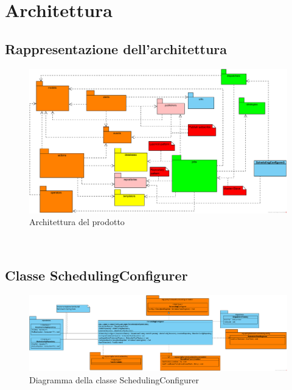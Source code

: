 \section{Architettura}
\label{architettura}

\subsection{Rappresentazione dell'architettura}

	\begin{figure}[H]{\textwidth}
  		\centering
  		\includegraphics[width=1\linewidth]{./img/ArchitetturaGenerale.png}
	  	\caption{Architettura del prodotto \ProjectName{}}
	\end{figure}\\

\subsection{Classe SchedulingConfigurer}

		\begin{figure}[htbp]
           	\centering
       	    \includegraphics[width=\textwidth]{./img/DiagrammiClasse/SchedulingConfigurer.png}
   	        \caption[Diagramma della classe SchedulingConfigurer]{Diagramma della classe SchedulingConfigurer}
	    \end{figure}\\
        
